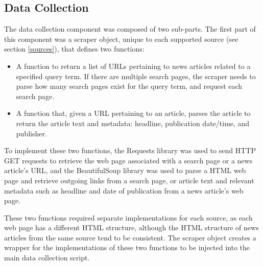 \documentclass{report}
\begin{document}
\subsection{Data Collection} \label{des-data-collection}

The data collection component was composed of two sub-parts.
The first part of this component was a scraper object, unique to each supported source (see section \ref{sources}), that defines two functions:
\begin{itemize}
	\item A function to return a list of URLs pertaining to news articles related to a specified query term.
		If there are multiple search pages, the scraper needs to parse how many search pages exist for the query term, and request each search page.
	\item A function that, given a URL pertaining to an article, parses the article to return the article text and metadata: headline, publication date/time, and publisher.
\end{itemize}

To implement these two functions, the Requests library \cite{Requests} was used to send HTTP GET requests to retrieve the web page associated with a search page or a news article's URL, and the BeautifulSoup library \cite{BeautifulSoup} was used to parse a HTML web page and retrieve outgoing links from a search page, or article text and relevant metadata such as headline and date of publication from a news article's web page.

These two functions required separate implementations for each source, as each web page has a different HTML structure, although the HTML structure of news articles from the same source tend to be consistent.
The scraper object creates a wrapper for the implementations of these two functions to be injected into the main data collection script.
\end{document}
